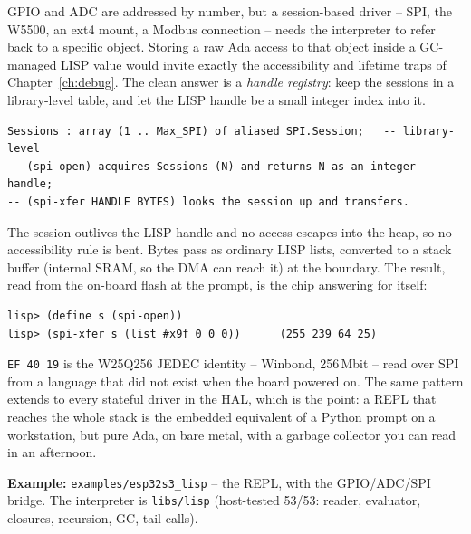 GPIO and ADC are addressed by number, but a session-based driver -- SPI, the W5500,
an ext4 mount, a Modbus connection -- needs the interpreter to refer back to a
specific object. Storing a raw Ada access to that object inside a GC-managed LISP
value would invite exactly the accessibility and lifetime traps of
Chapter~\ref{ch:debug}. The clean answer is a \emph{handle registry}: keep the
sessions in a library-level table, and let the LISP handle be a small integer index
into it.

\begin{lstlisting}
Sessions : array (1 .. Max_SPI) of aliased SPI.Session;   -- library-level
-- (spi-open) acquires Sessions (N) and returns N as an integer handle;
-- (spi-xfer HANDLE BYTES) looks the session up and transfers.
\end{lstlisting}

The session outlives the LISP handle and no access escapes into the heap, so no
accessibility rule is bent. Bytes pass as ordinary LISP lists, converted to a stack
buffer (internal SRAM, so the DMA can reach it) at the boundary. The result, read
from the on-board flash at the prompt, is the chip answering for itself:

\begin{lstlisting}[style=sh]
lisp> (define s (spi-open))
lisp> (spi-xfer s (list #x9f 0 0 0))      (255 239 64 25)
\end{lstlisting}

\texttt{EF 40 19} is the W25Q256 JEDEC identity -- Winbond, 256\,Mbit -- read over SPI
from a language that did not exist when the board powered on. The same pattern
extends to every stateful driver in the HAL, which is the point: a REPL that reaches
the whole stack is the embedded equivalent of a Python prompt on a workstation, but
pure Ada, on bare metal, with a garbage collector you can read in an afternoon.

\noindent\textbf{Example:} \texttt{examples/esp32s3\_lisp} -- the REPL, with the
GPIO/ADC/SPI bridge. The interpreter is \texttt{libs/lisp} (host-tested 53/53:
reader, evaluator, closures, recursion, GC, tail calls).
